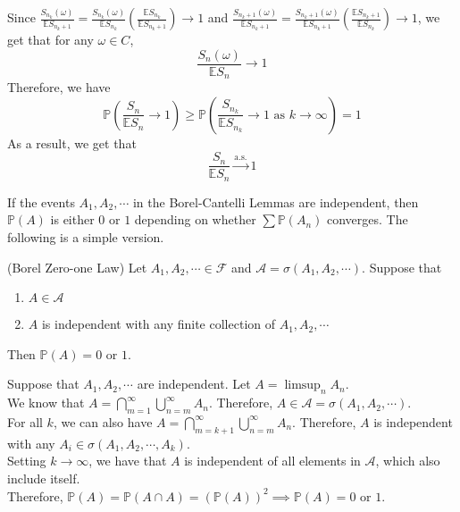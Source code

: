 \documentclass{huhtakm-template-book}
\newcommand{\prob}{\mathbb{P}}
\newcommand{\expect}{\mathbb{E}}
\begin{document}
\begin{proofing}
    Since $\frac{S_{n_{k}}(\omega)}{\expect S_{n_{k}+1}}=\frac{S_{n_{k}}(\omega)}{\expect S_{n_{k}}}\left(\frac{\expect S_{n_{k}}}{\expect S_{n_{k}+1}}\right)\to 1$ and $\frac{S_{n_{k}+1}(\omega)}{\expect S_{n_{k}+1}}=\frac{S_{n_{k}+1}(\omega)}{\expect S_{n_{k}+1}}\left(\frac{\expect S_{n_{k}+1}}{\expect S_{n_{k}}}\right)\to 1$, we get that for any $\omega\in C$,
    \begin{equation*}
        \frac{S_{n}(\omega)}{\expect S_{n}}\to 1
    \end{equation*}
    Therefore, we have
    \begin{equation*}
        \prob\left(\frac{S_{n}}{\expect S_{n}}\to 1\right)\geq\prob\left(\frac{S_{n_{k}}}{\expect S_{n_{k}}}\to 1\text{ as }k\to\infty\right)=1
    \end{equation*}
    As a result, we get that
    \begin{equation*}
        \frac{S_{n}}{\expect S_{n}}\xrightarrow{\text{a.s.}}1
    \end{equation*}
\end{proofing}
If the events $A_{1}, A_{2},\cdots$ in the Borel-Cantelli Lemmas are independent, then $\prob(A)$ is either $0$ or $1$ depending on whether $\sum\prob(A_{n})$ converges. The following is a simple version.
\begin{thm}(Borel Zero-one Law)
    Let $A_{1},A_{2},\cdots\in\mathcal{F}$ and $\mathcal{A}=\sigma(A_{1},A_{2},\cdots)$. Suppose that
    \begin{enumerate}
        \item $A\in\mathcal{A}$
        \item $A$ is independent with any finite collection of $A_{1},A_{2},\cdots$
    \end{enumerate}
    Then $\prob(A)=0$ or $1$.
\end{thm}
\begin{proofing}
    Suppose that $A_{1},A_{2},\cdots$ are independent. Let $A=\limsup_{n}A_{n}$.\\
    We know that $A=\bigcap_{m=1}^{\infty}\bigcup_{n=m}^{\infty}A_{n}$. Therefore, $A\in\mathcal{A}=\sigma(A_{1},A_{2},\cdots)$.\\
    For all $k$, we can also have $A=\bigcap_{m=k+1}^{\infty}\bigcup_{n=m}^{\infty}A_{n}$. Therefore, $A$ is independent with any $A_{i}\in\sigma(A_{1},A_{2},\cdots,A_{k})$.\\
    Setting $k\to\infty$, we have that $A$ is independent of all elements in $\mathcal{A}$, which also include itself.\\
    Therefore, $\prob(A)=\prob(A\cap A)=(\prob(A))^{2}\implies\prob(A)=0$ or $1$.
\end{proofing}
\end{document}
